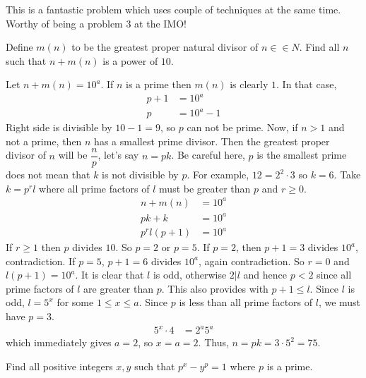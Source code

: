 \documentclass[problems.tex]{subfile}
\begin{document}
	\begin{note}
		This is a fantastic problem which uses couple of techniques at the same time. Worthy of being a problem $3$ at the IMO!
	\end{note}
	
	\begin{problem}
		Define $m(n)$ to be the greatest proper natural divisor of $n \in\in N$. Find all $n$ such that $n + m(n)$ is a power of $10$.
	\end{problem}
	
	\begin{solution}
		Let $n+m(n)=10^a$. If $n$ is a prime then $m(n)$ is clearly $1$. In that case,
		\begin{align*}
		p+1 & = 10^a\\
		p & = 10^a-1
		\end{align*} 
		Right side is divisible by $10-1=9$, so $p$ can not be prime. Now, if $n>1$ and not a prime, then $n$ has a smallest prime divisor. Then the greatest proper divisor of $n$ will be $\dfrac{n}{p}$, let's say $n=pk$. Be careful here, $p$ is the smallest prime does not mean that $k$ is not divisible by $p$. For example, $12=2^2\cdot3$ so $k=6$. Take $k=p^rl$ where all prime factors of $l$ must be greater than $p$ and $r\geq0$.
		\begin{align*}
		n+m(n) & = 10^a\\
		pk+k & = 10^a\\
		p^rl(p+1) & = 10^a
		\end{align*}
		If $r\geq1$ then $p$ divides $10$. So $p=2$ or $p=5$. If $p=2$, then $p+1=3$ divides $10^a$, contradiction. If $p=5$, $p+1=6$ divides $10^a$, again contradiction. So $r=0$ and $l(p+1)=10^a$. It is clear that $l$ is odd, otherwise $2|l$ and hence $p<2$ since all prime factors of $l$ are greater than $p$. This also provides with $p+1\leq l$. Since $l$ is odd, $l=5^x$ for some $1\leq x\leq a$. Since $p$ is less than all prime factors of $l$, we must have $p=3$.
		\begin{align*}
		5^x\cdot4 & = 2^a5^a
		\end{align*}
		which immediately gives $a=2$, so $x=a=2$. Thus, $n=pk=3\cdot5^2=75$.
	\end{solution}
	
	\begin{problem}
		Find all positive integers $x, y$ such that $p^x - y^p = 1$ where $p$ is a prime.
	\end{problem}
	
\end{document}

